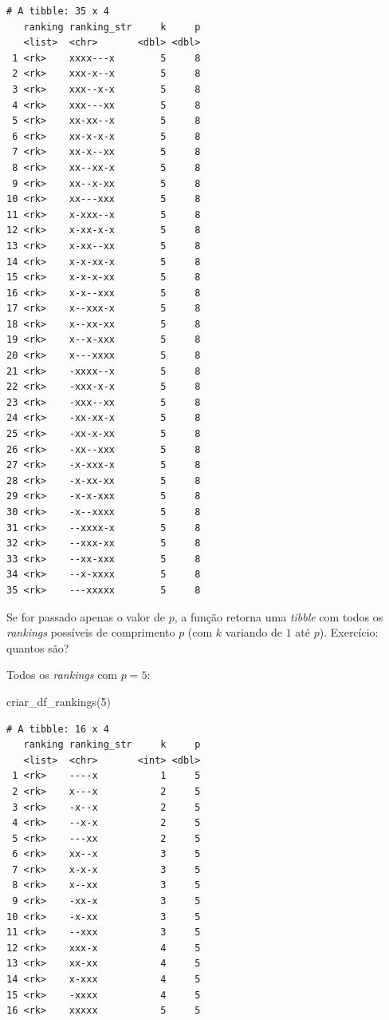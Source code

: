 \documentclass[
  letterpaper,
  DIV=11,
  numbers=noendperiod]{scrreprt}
\newenvironment{Shaded}{\begin{snugshade}}{\end{snugshade}}
\newcommand{\DecValTok}[1]{\textcolor[rgb]{0.68,0.00,0.00}{#1}}
\newcommand{\FunctionTok}[1]{\textcolor[rgb]{0.28,0.35,0.67}{#1}}
\newcommand{\NormalTok}[1]{\textcolor[rgb]{0.00,0.23,0.31}{#1}}
\begin{document}
\begin{verbatim}
# A tibble: 35 x 4
   ranking ranking_str     k     p
   <list>  <chr>       <dbl> <dbl>
 1 <rk>    xxxx---x        5     8
 2 <rk>    xxx-x--x        5     8
 3 <rk>    xxx--x-x        5     8
 4 <rk>    xxx---xx        5     8
 5 <rk>    xx-xx--x        5     8
 6 <rk>    xx-x-x-x        5     8
 7 <rk>    xx-x--xx        5     8
 8 <rk>    xx--xx-x        5     8
 9 <rk>    xx--x-xx        5     8
10 <rk>    xx---xxx        5     8
11 <rk>    x-xxx--x        5     8
12 <rk>    x-xx-x-x        5     8
13 <rk>    x-xx--xx        5     8
14 <rk>    x-x-xx-x        5     8
15 <rk>    x-x-x-xx        5     8
16 <rk>    x-x--xxx        5     8
17 <rk>    x--xxx-x        5     8
18 <rk>    x--xx-xx        5     8
19 <rk>    x--x-xxx        5     8
20 <rk>    x---xxxx        5     8
21 <rk>    -xxxx--x        5     8
22 <rk>    -xxx-x-x        5     8
23 <rk>    -xxx--xx        5     8
24 <rk>    -xx-xx-x        5     8
25 <rk>    -xx-x-xx        5     8
26 <rk>    -xx--xxx        5     8
27 <rk>    -x-xxx-x        5     8
28 <rk>    -x-xx-xx        5     8
29 <rk>    -x-x-xxx        5     8
30 <rk>    -x--xxxx        5     8
31 <rk>    --xxxx-x        5     8
32 <rk>    --xxx-xx        5     8
33 <rk>    --xx-xxx        5     8
34 <rk>    --x-xxxx        5     8
35 <rk>    ---xxxxx        5     8
\end{verbatim}

Se for passado apenas o valor de $p$, a função retorna uma \emph{tibble}
com todos os \emph{rankings} possíveis de comprimento $p$ (com $k$
variando de $1$ até $p$). Exercício: quantos são?

Todos os \emph{rankings} com $p = 5$:

\begin{Shaded}
\begin{Highlighting}[]
\FunctionTok{criar\_df\_rankings}\NormalTok{(}\DecValTok{5}\NormalTok{)}
\end{Highlighting}
\end{Shaded}

\begin{verbatim}
# A tibble: 16 x 4
   ranking ranking_str     k     p
   <list>  <chr>       <int> <dbl>
 1 <rk>    ----x           1     5
 2 <rk>    x---x           2     5
 3 <rk>    -x--x           2     5
 4 <rk>    --x-x           2     5
 5 <rk>    ---xx           2     5
 6 <rk>    xx--x           3     5
 7 <rk>    x-x-x           3     5
 8 <rk>    x--xx           3     5
 9 <rk>    -xx-x           3     5
10 <rk>    -x-xx           3     5
11 <rk>    --xxx           3     5
12 <rk>    xxx-x           4     5
13 <rk>    xx-xx           4     5
14 <rk>    x-xxx           4     5
15 <rk>    -xxxx           4     5
16 <rk>    xxxxx           5     5
\end{verbatim}
\end{document}
